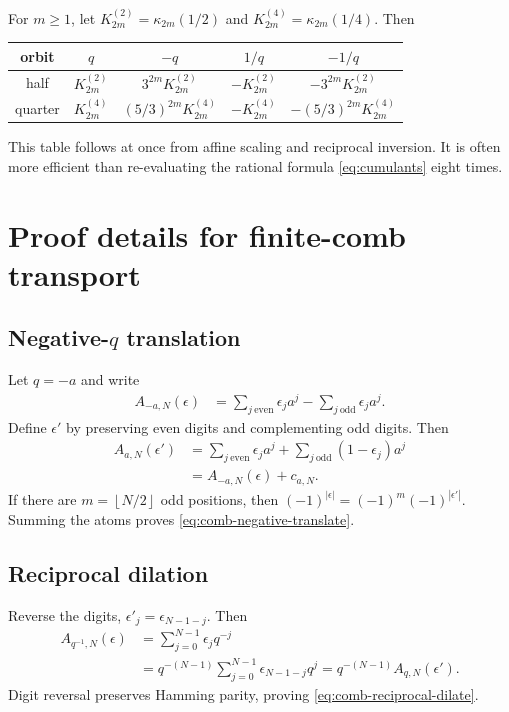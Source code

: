 \documentclass[11pt,oneside]{article}
\numberwithin{equation}{section}
\theoremstyle{definition}
\theoremstyle{remark}
\newcommand{\floor}[1]{\left\lfloor#1\right\rfloor}
\begin{document}
For $m\ge1$, let $K_{2m}^{(2)}=\kappa_{2m}(1/2)$ and
$K_{2m}^{(4)}=\kappa_{2m}(1/4)$.  Then
\begin{center}
\begin{tabular}{c c c c c}
\toprule
orbit & $q$ & $-q$ & $1/q$ & $-1/q$ \\
\midrule
half & $K_{2m}^{(2)}$ & $3^{2m}K_{2m}^{(2)}$ & $-K_{2m}^{(2)}$ & $-3^{2m}K_{2m}^{(2)}$ \\
quarter & $K_{2m}^{(4)}$ & $(5/3)^{2m}K_{2m}^{(4)}$ & $-K_{2m}^{(4)}$ & $-(5/3)^{2m}K_{2m}^{(4)}$ \\
\bottomrule
\end{tabular}
\end{center}
This table follows at once from affine scaling and reciprocal inversion.  It
is often more efficient than re-evaluating the rational formula
\eqref{eq:cumulants} eight times.

\section{Proof details for finite-comb transport}
\label{app:comb-proofs}

\subsection[Negative-q translation]{Negative-$q$ translation}

Let $q=-a$ and write
\begin{align*}
 A_{-a,N}(\epsilon)
 &=\sum_{j\ \mathrm{even}}\epsilon_ja^j
   -\sum_{j\ \mathrm{odd}}\epsilon_ja^j.
\end{align*}
Define $\epsilon'$ by preserving even digits and complementing odd digits.
Then
\begin{align*}
 A_{a,N}(\epsilon')
 &=\sum_{j\ \mathrm{even}}\epsilon_ja^j
   +\sum_{j\ \mathrm{odd}}(1-\epsilon_j)a^j\\
 &=A_{-a,N}(\epsilon)+c_{a,N}.
\end{align*}
If there are $m=\floor{N/2}$ odd positions, then
$(-1)^{|\epsilon|}=(-1)^m(-1)^{|\epsilon'|}$.  Summing the atoms proves
\eqref{eq:comb-negative-translate}.

\subsection{Reciprocal dilation}

Reverse the digits, $\epsilon'_j=\epsilon_{N-1-j}$.  Then
\begin{align*}
 A_{q^{-1},N}(\epsilon)
 &=\sum_{j=0}^{N-1}\epsilon_jq^{-j}\\
 &=q^{-(N-1)}\sum_{j=0}^{N-1}\epsilon_{N-1-j}q^j
 =q^{-(N-1)}A_{q,N}(\epsilon').
\end{align*}
Digit reversal preserves Hamming parity, proving
\eqref{eq:comb-reciprocal-dilate}.
\end{document}
